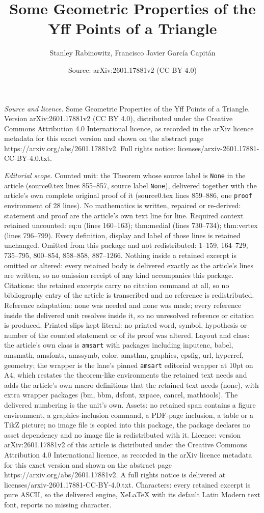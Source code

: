 \documentclass[10pt,a4paper]{amsart}
\title[Some Geometric Properties of the Yff Points of a Triangle]{Some Geometric Properties of the Yff Points of a Triangle}
\author{Stanley Rabinowitz, Francisco Javier Garc\'ia Capit\'an}
\date{Source: arXiv:2601.17881v2 (CC BY 4.0)}
\begin{document}
\maketitle

\noindent\emph{Source and licence.} Some Geometric Properties of the Yff Points of a Triangle. Version arXiv:2601.17881v2 (CC BY 4.0), distributed under the Creative Commons Attribution 4.0 International licence, as recorded in the arXiv licence metadata for this exact version and shown on the abstract page https://arxiv.org/abs/2601.17881v2. Full rights notice: licenses/arxiv-2601.17881-CC-BY-4.0.txt.\par\smallskip

\noindent\textit{Editorial scope.} Counted unit: the Theorem whose source label is \texttt{None} in the article (source0.tex lines 855--857, source label \texttt{None}), delivered together with the article's own complete original proof of it (source0.tex lines 859--886, one \texttt{proof} environment of 28 lines). No mathematics is written, repaired or re-derived: statement and proof are the article's own text line for line. Required context retained uncounted: eq:u (lines 160--163); thm:medial (lines 730--734); thm:vertex (lines 796--799). Every definition, display and label of those lines is retained unchanged. Omitted from this package and not redistributed: 1--159, 164--729, 735--795, 800--854, 858--858, 887--1266. Nothing inside a retained excerpt is omitted or altered: every retained body is delivered exactly as the article's lines are written, so no omission receipt of any kind accompanies this package. Citations: the retained excerpts carry no citation command at all, so no bibliography entry of the article is transcribed and no reference is redistributed. Reference adaptation: none was needed and none was made; every reference inside the delivered unit resolves inside it, so no unresolved reference or citation is produced. Printed slips kept literal: no printed word, symbol, hypothesis or number of the counted statement or of its proof was altered. Layout and class: the article's own class is \texttt{amsart} with packages including inputenc, babel, amsmath, amsfonts, amssymb, color, amsthm, graphics, epsfig, url, hyperref, geometry; the wrapper is the lane's pinned \texttt{amsart} editorial wrapper at 10pt on A4, which restates the theorem-like environments the retained text needs and adds the article's own macro definitions that the retained text needs (none), with extra wrapper packages (bm, bbm, dsfont, xspace, cancel, mathtools). The delivered numbering is the unit's own. Assets: no retained span contains a figure environment, a graphics-inclusion command, a PDF-page inclusion, a table or a TikZ picture; no image file is copied into this package, the package declares no asset dependency and no image file is redistributed with it. Licence: version arXiv:2601.17881v2 of this article is distributed under the Creative Commons Attribution 4.0 International licence, as recorded in the arXiv licence metadata for this exact version and shown on the abstract page https://arxiv.org/abs/2601.17881v2. A full rights notice is delivered at licenses/arxiv-2601.17881-CC-BY-4.0.txt. Characters: every retained excerpt is pure ASCII, so the delivered engine, XeLaTeX with its default Latin Modern text font, reports no missing character.
\end{document}
